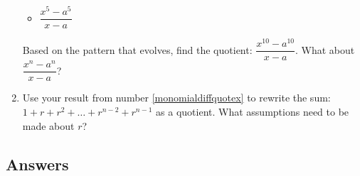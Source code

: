 \documentclass{ximera}
\begin{document}
\begin{enumerate}
\begin{multicols}{5}
\begin{itemize}
\item $\dfrac{x^5 - a^5}{x-a}$ 


\end{itemize}

\end{multicols}

Based on the pattern that evolves, find the quotient: $\dfrac{x^{10} - a^{10}}{x-a}$.  What about  $\dfrac{x^{n} - a^{n}}{x-a}$?


\item  \label{geoseriespreview} Use your result from number \ref{monomialdiffquotex} to rewrite the sum: $1 + r + r^2 + \dots + r^{n-2} + r^{n-1}$ as a quotient. What assumptions need to be made about $r$?

\setcounter{HW}{\value{enumi}}
\end{enumerate}

\newpage

\subsection{Answers}
\end{document}
